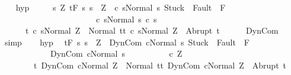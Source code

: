 \begin{isabellebody}
\ \ \isamarkupfalse%
\ hyp{\isacharcolon}\ \isanewline
\ \ \ \ {\isachardoublequoteopen}{\isasymAnd}s{\isacharprime}{\isachardot}\ {\isasymforall}Z{\isachardot}\ {\isasymGamma}{\isacharcomma}{\isasymTheta}{\isasymturnstile}\isactrlsub t\isactrlbsub {\isacharslash}F\isactrlesub \ {\isacharbraceleft}s{\isachardot}\ s\ {\isacharequal}\ Z\ {\isasymand}\ {\isasymGamma}{\isasymturnstile}{\isasymlangle}c\ s{\isacharprime}{\isacharcomma}Normal\ s{\isasymrangle}\ {\isasymRightarrow}{\isasymnotin}{\isacharparenleft}{\isacharbraceleft}Stuck{\isacharbraceright}\ {\isasymunion}\ Fault\ {\isacharbackquote}\ {\isacharparenleft}{\isacharminus}F{\isacharparenright}{\isacharparenright}\ {\isasymand}\ \isanewline
\ \ \ \ \ \ \ \ \ \ \ \ \ \ \ \ \ \ \ \ \ \ \ {\isasymGamma}{\isasymturnstile}c\ s{\isacharprime}{\isasymdown}Normal\ s{\isacharbraceright}\ c\ s{\isacharprime}\isanewline
\ \ \ \ \ \ {\isacharbraceleft}t{\isachardot}\ {\isasymGamma}{\isasymturnstile}{\isasymlangle}c\ s{\isacharprime}{\isacharcomma}Normal\ Z{\isasymrangle}\ {\isasymRightarrow}\ Normal\ t{\isacharbraceright}{\isacharcomma}{\isacharbraceleft}t{\isachardot}\ {\isasymGamma}{\isasymturnstile}{\isasymlangle}c\ s{\isacharprime}{\isacharcomma}Normal\ Z{\isasymrangle}\ {\isasymRightarrow}\ Abrupt\ t{\isacharbraceright}{\isachardoublequoteclose}\isanewline
\ \ \ \ \isamarkupfalse%
\ DynCom\ \isamarkupfalse%
\ simp\isanewline
\ \ \isamarkupfalse%
\ hyp{\isacharprime}{\isacharcolon}\isanewline
\ \ {\isachardoublequoteopen}{\isasymGamma}{\isacharcomma}{\isasymTheta}{\isasymturnstile}\isactrlsub t\isactrlbsub {\isacharslash}F\ \isactrlesub {\isacharbraceleft}s{\isachardot}\ s\ {\isacharequal}\ Z\ {\isasymand}\ {\isasymGamma}{\isasymturnstile}{\isasymlangle}DynCom\ c{\isacharcomma}Normal\ s{\isasymrangle}\ {\isasymRightarrow}{\isasymnotin}{\isacharparenleft}{\isacharbraceleft}Stuck{\isacharbraceright}\ {\isasymunion}\ Fault\ {\isacharbackquote}\ {\isacharparenleft}{\isacharminus}F{\isacharparenright}{\isacharparenright}\ {\isasymand}\ \isanewline
\ \ \ \ \ \ \ \ \ \ \ \ {\isasymGamma}{\isasymturnstile}DynCom\ c{\isasymdown}Normal\ s{\isacharbraceright}\ \isanewline
\ \ \ \ \ \ \ \ \ {\isacharparenleft}c\ Z{\isacharparenright}\isanewline
\ \ \ \ \ \ \ \ {\isacharbraceleft}t{\isachardot}\ {\isasymGamma}{\isasymturnstile}{\isasymlangle}DynCom\ c{\isacharcomma}Normal\ Z{\isasymrangle}\ {\isasymRightarrow}\ Normal\ t{\isacharbraceright}{\isacharcomma}{\isacharbraceleft}t{\isachardot}\ {\isasymGamma}{\isasymturnstile}{\isasymlangle}DynCom\ c{\isacharcomma}Normal\ Z{\isasymrangle}\ {\isasymRightarrow}\ Abrupt\ t{\isacharbraceright}{\isachardoublequoteclose}\isanewline

\end{isabellebody}
